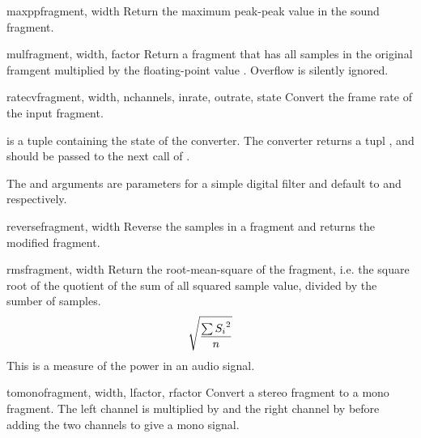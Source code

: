 \begin{funcdesc}{maxpp}{fragment, width}
Return the maximum peak-peak value in the sound fragment.
\end{funcdesc}

\begin{funcdesc}{mul}{fragment, width, factor}
Return a fragment that has all samples in the original framgent
multiplied by the floating-point value .  Overflow is
silently ignored.
\end{funcdesc}

\begin{funcdesc}{ratecv}{fragment, width, nchannels, inrate, outrate,
                         state}
Convert the frame rate of the input fragment.

 is a tuple containing the state of the converter.  The
converter returns a tupl ,
and  should be passed to the next call of
.

The  and  arguments are parameters for a
simple digital filter and default to  and 
respectively.
\end{funcdesc}

\begin{funcdesc}{reverse}{fragment, width}
Reverse the samples in a fragment and returns the modified fragment.
\end{funcdesc}

\begin{funcdesc}{rms}{fragment, width}
Return the root-mean-square of the fragment, i.e.
\iftexi
the square root of the quotient of the sum of all squared sample value,
divided by the sumber of samples.
\else
\begin{displaymath}
\catcode`_=8
\sqrt{\frac{\sum{{S_{i}}^{2}}}{n}}
\end{displaymath}
\fi
This is a measure of the power in an audio signal.
\end{funcdesc}

\begin{funcdesc}{tomono}{fragment, width, lfactor, rfactor} 
Convert a stereo fragment to a mono fragment.  The left channel is
multiplied by  and the right channel by 
before adding the two channels to give a mono signal.
\end{funcdesc}


